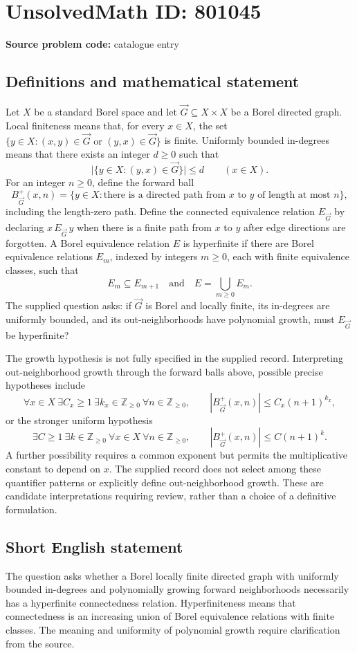 \documentclass[11pt]{article}
\newcommand{\Z}{\mathbb{Z}}
\begin{document}
\section*{UnsolvedMath ID: 801045}
\textbf{Source problem code:} catalogue entry
\subsection{Definitions and mathematical statement}
Let \(X\) be a standard Borel space and let \(\vec G\subseteq X\times X\) be a Borel directed graph. Local finiteness means that, for every \(x\in X\), the set \(\{y\in X:(x,y)\in\vec G\text{ or }(y,x)\in\vec G\}\) is finite. Uniformly bounded in-degrees means that there exists an integer \(d\geq 0\) such that
\[
\bigl|\{y\in X:(y,x)\in\vec G\}\bigr|\leq d\qquad(x\in X).
\]
For an integer \(n\geq 0\), define the forward ball
\[
B^+_{\vec G}(x,n)=\{y\in X:\text{there is a directed path from }x\text{ to }y\text{ of length at most }n\},
\]
including the length-zero path. Define the connected equivalence relation \(E_{\vec G}\) by declaring \(x\,E_{\vec G}\,y\) when there is a finite path from \(x\) to \(y\) after edge directions are forgotten. A Borel equivalence relation \(E\) is hyperfinite if there are Borel equivalence relations \(E_m\), indexed by integers \(m\geq 0\), each with finite equivalence classes, such that
\[
E_m\subseteq E_{m+1}\quad\text{and}\quad E=\bigcup_{m\geq 0}E_m.
\]
The supplied question asks: if \(\vec G\) is Borel and locally finite, its in-degrees are uniformly bounded, and its out-neighborhoods have polynomial growth, must \(E_{\vec G}\) be hyperfinite?

The growth hypothesis is not fully specified in the supplied record. Interpreting out-neighborhood growth through the forward balls above, possible precise hypotheses include
\[
\forall x\in X\ \exists C_x\geq 1\ \exists k_x\in\Z_{\geq 0}\ \forall n\in\Z_{\geq 0},\qquad |B^+_{\vec G}(x,n)|\leq C_x(n+1)^{k_x},
\]
or the stronger uniform hypothesis
\[
\exists C\geq 1\ \exists k\in\Z_{\geq 0}\ \forall x\in X\ \forall n\in\Z_{\geq 0},\qquad |B^+_{\vec G}(x,n)|\leq C(n+1)^k.
\]
A further possibility requires a common exponent but permits the multiplicative constant to depend on \(x\). The supplied record does not select among these quantifier patterns or explicitly define out-neighborhood growth. These are candidate interpretations requiring review, rather than a choice of a definitive formulation.
\subsection{Short English statement}
The question asks whether a Borel locally finite directed graph with uniformly bounded in-degrees and polynomially growing forward neighborhoods necessarily has a hyperfinite connectedness relation. Hyperfiniteness means that connectedness is an increasing union of Borel equivalence relations with finite classes. The meaning and uniformity of polynomial growth require clarification from the source.
\end{document}
